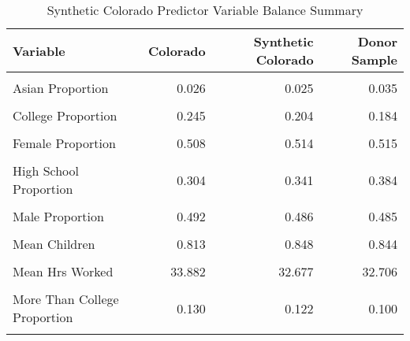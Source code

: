 \begin{table}[H]

\caption{\label{tab:balance_table_colorado}Synthetic Colorado Predictor Variable Balance Summary}
\centering
\begin{tabular}[t]{lrrr}
\toprule
Variable & Colorado & Synthetic Colorado & Donor Sample\\
\midrule
\cellcolor{gray!6}{American Indian Proportion} & \cellcolor{gray!6}{0.009} & \cellcolor{gray!6}{0.022} & \cellcolor{gray!6}{0.014}\\
Asian Proportion & 0.026 & 0.025 & 0.035\\
\cellcolor{gray!6}{Black Proportion} & \cellcolor{gray!6}{0.030} & \cellcolor{gray!6}{0.059} & \cellcolor{gray!6}{0.098}\\
College Proportion & 0.245 & 0.204 & 0.184\\
\cellcolor{gray!6}{Employed Proportion} & \cellcolor{gray!6}{0.753} & \cellcolor{gray!6}{0.732} & \cellcolor{gray!6}{0.726}\\
\addlinespace
Female Proportion & 0.508 & 0.514 & 0.515\\
\cellcolor{gray!6}{Hispanic Proportion} & \cellcolor{gray!6}{0.139} & \cellcolor{gray!6}{0.120} & \cellcolor{gray!6}{0.067}\\
High School Proportion & 0.304 & 0.341 & 0.384\\
\cellcolor{gray!6}{Less Than High School Proportion} & \cellcolor{gray!6}{0.068} & \cellcolor{gray!6}{0.084} & \cellcolor{gray!6}{0.090}\\
Male Proportion & 0.492 & 0.486 & 0.485\\
\addlinespace
\cellcolor{gray!6}{Married Proportion} & \cellcolor{gray!6}{0.632} & \cellcolor{gray!6}{0.604} & \cellcolor{gray!6}{0.627}\\
Mean Children & 0.813 & 0.848 & 0.844\\
\cellcolor{gray!6}{Mean Children U5} & \cellcolor{gray!6}{0.183} & \cellcolor{gray!6}{0.179} & \cellcolor{gray!6}{0.174}\\
Mean Hrs Worked & 33.882 & 32.677 & 32.706\\
\cellcolor{gray!6}{Median Income} & \cellcolor{gray!6}{24523.077} & \cellcolor{gray!6}{23473.869} & \cellcolor{gray!6}{21327.955}\\
\addlinespace
More Than College Proportion & 0.130 & 0.122 & 0.100\\
\cellcolor{gray!6}{Not Employed Proportion} & \cellcolor{gray!6}{0.247} & \cellcolor{gray!6}{0.268} & \cellcolor{gray!6}{0.274}\\

\end{tabular}
\end{table}
